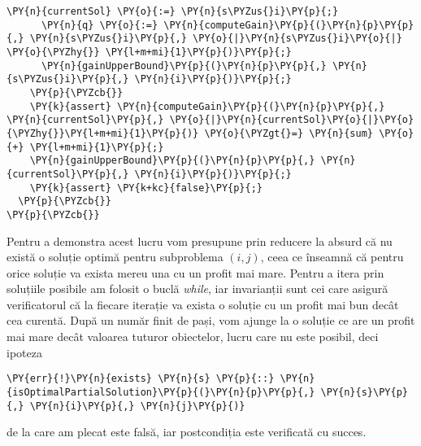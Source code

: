 \begin{sloppypar}
\begin{Verbatim}[commandchars=\\\{\}]
      \PY{n}{currentSol} \PY{o}{:=} \PY{n}{s\PYZus{}i}\PY{p}{;}
      \PY{n}{q} \PY{o}{:=} \PY{n}{computeGain}\PY{p}{(}\PY{n}{p}\PY{p}{,} \PY{n}{s\PYZus{}i}\PY{p}{,} \PY{o}{|}\PY{n}{s\PYZus{}i}\PY{o}{|} \PY{o}{\PYZhy{}} \PY{l+m+mi}{1}\PY{p}{)}\PY{p}{;}
      \PY{n}{gainUpperBound}\PY{p}{(}\PY{n}{p}\PY{p}{,} \PY{n}{s\PYZus{}i}\PY{p}{,} \PY{n}{i}\PY{p}{)}\PY{p}{;}
    \PY{p}{\PYZcb{}}
    \PY{k}{assert} \PY{n}{computeGain}\PY{p}{(}\PY{n}{p}\PY{p}{,} \PY{n}{currentSol}\PY{p}{,} \PY{o}{|}\PY{n}{currentSol}\PY{o}{|}\PY{o}{\PYZhy{}}\PY{l+m+mi}{1}\PY{p}{)} \PY{o}{\PYZgt{}=} \PY{n}{sum} \PY{o}{+} \PY{l+m+mi}{1}\PY{p}{;}
    \PY{n}{gainUpperBound}\PY{p}{(}\PY{n}{p}\PY{p}{,} \PY{n}{currentSol}\PY{p}{,} \PY{n}{i}\PY{p}{)}\PY{p}{;}
    \PY{k}{assert} \PY{k+kc}{false}\PY{p}{;}
  \PY{p}{\PYZcb{}}
\PY{p}{\PYZcb{}}
\end{Verbatim}
\hspace{4mm} Pentru a demonstra acest lucru vom presupune prin reducere la absurd că nu există o soluție optimă pentru subproblema $(i, j)$, ceea ce  înseamnă că pentru orice soluție va exista mereu una cu un profit mai mare. Pentru a itera prin soluțiile posibile am folosit o buclă \textit{while}, iar invarianții sunt cei care asigură verificatorul că la fiecare iterație va exista o soluție cu un profit mai bun decât cea curentă. După un număr finit de pași, vom ajunge la o soluție ce are un profit mai mare decât valoarea tuturor obiectelor, lucru care nu este posibil, deci ipoteza
\begin{Verbatim}[commandchars=\\\{\}]
\PY{err}{!}\PY{n}{exists} \PY{n}{s} \PY{p}{::} \PY{n}{isOptimalPartialSolution}\PY{p}{(}\PY{n}{p}\PY{p}{,} \PY{n}{s}\PY{p}{,} \PY{n}{i}\PY{p}{,} \PY{n}{j}\PY{p}{)}
\end{Verbatim}
de la care am plecat este falsă, iar postcondiția este verificată cu succes.

\end{sloppypar}